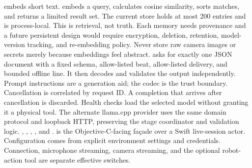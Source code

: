 {} embeds short text.  embeds a query, calculates cosine similarity, sorts matches, and returns a limited result set. The current store holds at most 200 entries and is process-local.\markdownRendererParagraphSeparator
{}This is retrieval, not truth. Each memory needs provenance and a future persistent design would require encryption, deletion, retention, model-version tracking, and re-embedding policy. Never store raw camera images or secrets merely because embeddings feel abstract.\markdownRendererInterblockSeparator
{}
\markdownRendererSectionEnd \markdownRendererSectionBegin
{}\markdownRendererInterblockSeparator
{} asks for exactly one JSON document with a fixed schema, allow-listed beat, allow-listed delivery, and bounded offline line. It then decodes and validates the output independently. Prompt instructions are a generation aid; the codec is the trust boundary.\markdownRendererInterblockSeparator
{}\markdownRendererInterblockSeparator
{}Cancellation is correlated by request ID. A completion that arrives after cancellation is discarded. Health checks load the selected model without granting it a physical tool. The alternate llama.cpp provider uses the same domain protocol and loopback HTTP, preserving the stage coordinator and validation logic.\markdownRendererInterblockSeparator
{}
\markdownRendererSectionEnd \markdownRendererSectionBegin
{}\markdownRendererInterblockSeparator
{}\markdownRendererBlockQuoteBegin
{} , , , , and .\markdownRendererBlockQuoteEnd \markdownRendererInterblockSeparator
{} is the Objective-C-facing façade over a Swift live-session actor. Configuration comes from explicit environment settings and credentials. Connection, microphone streaming, camera streaming, and the optional robot-action tool are separate effective switches.\markdownRendererParagraphSeparator
